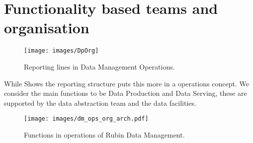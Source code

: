 \section{Functionality based teams and organisation} \label{sec:org}

\begin{figure}
\begin{centering}
\texttt{[image: images/DpOrg]}
	\caption{Reporting lines in Data Management Operations.
\label{fig:org}}
\end{centering}
\end{figure}


While  Shows the reporting structure  puts this more in a operations concept. We consider the main functions to be Data Production and Data Serving, these are supported by the data abstraction team and the data facilities.

\begin{figure}
\begin{centering}
\texttt{[image: images/dm\_ops\_org\_arch.pdf]}
\caption{Functions in operations of Rubin Data Management.\label{fig:arcorg}}
\end{centering}
\end{figure}
